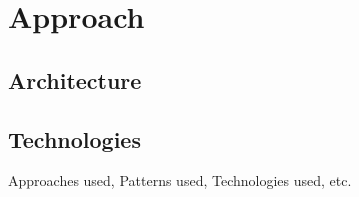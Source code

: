 \chapter{Approach}

\section{Architecture}

\section{Technologies}

Approaches used, Patterns used, Technologies used, etc.
